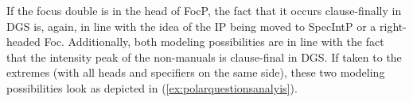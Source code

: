 If the focus double is in the head of FocP, the fact that it occurs clause-finally in DGS is, again, in line with the idea of the IP being moved to SpecIntP or a right-headed Foc\textdegree . Additionally, both modeling possibilities are in line with the fact that the intensity peak of the non-manuals is clause-final in DGS. If taken to the extremes (with all heads and specifiers on the same side), these two modeling possibilities look as depicted in (\ref{ex:polarquestionsanalyis}). 
%
%
%
%
%
%
%
%
%
%




